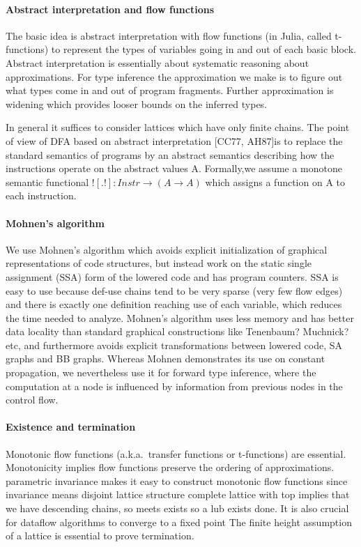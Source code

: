 \documentclass[pldi]{sigplanconf-pldi15}
\begin{document}


\paragraph{Abstract interpretation and flow functions}
The basic idea is abstract interpretation with flow functions (in Julia, called
t-functions) to represent the types of variables going in and out of each basic
block.  Abstract interpretation is essentially about systematic reasoning about
approximations. For type inference the approximation we make is to figure out
what types come in and out of program fragments. Further approximation is
widening which provides looser bounds on the inferred types. 

In general it suffices to consider lattices which have only finite chains. The
point of view of DFA based on abstract interpretation [CC77, AH87]is to replace
the standard semantics of programs by an abstract semantics describing how the
instructions operate on the abstract values A. Formally,we assume a
monotone semantic functional $![.!] : Instr \rightarrow (A \rightarrow A)$
which assigns a function on A to each instruction.

\paragraph{Mohnen's algorithm}
We use Mohnen's algorithm which avoids explicit initialization of graphical
representations of code structures, but instead work on the static single
assignment (SSA) form of the lowered code and has program counters. SSA is easy
to use because def-use chains tend to be very sparse (very few flow edges) and
there is exactly one definition reaching use of each variable, which reduces
the time needed to analyze. Mohnen's algorithm uses less memory and has better
data locality than standard graphical constructions like Tenenbaum? Muchnick?
etc, and furthermore avoids explicit transformations between lowered code, SA
graphs and BB graphs. Whereas Mohnen demonstrates its use on constant
propagation, we nevertheless use it for forward type inference, where the
computation at a node is influenced by information from previous nodes in the
control flow.

\paragraph{Existence and termination}
Monotonic flow functions (a.k.a.\ transfer functions or t-functions) are essential.
Monotonicity implies flow functions preserve the ordering of approximations.
parametric invariance makes it easy to construct monotonic flow functions since invariance means disjoint lattice structure
complete lattice with top implies that we have descending chains, so meets exists so a lub exists done.
It is also crucial for dataflow algorithms to converge to a fixed point
The finite height assumption of a lattice is essential to prove termination.
\end{document}
